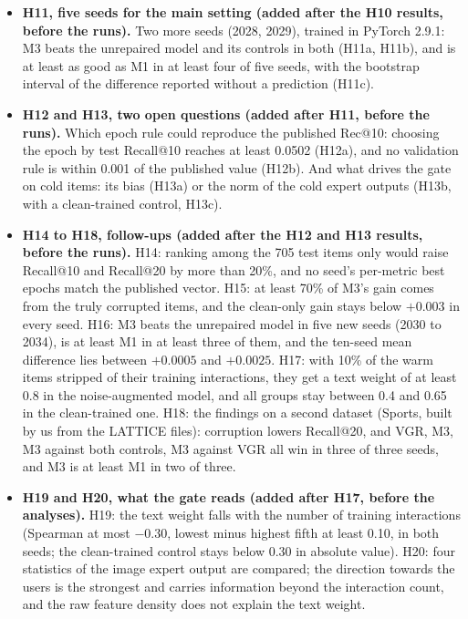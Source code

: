 \documentclass[conference]{IEEEtran}
\begin{document}
\begin{itemize}
\item \textbf{H11, five seeds for the main setting (added after the H10 results, before the runs).} Two more seeds (2028, 2029), trained in PyTorch 2.9.1: M3 beats the unrepaired model and its controls in both (H11a, H11b), and is at least as good as M1 in at least four of five seeds, with the bootstrap interval of the difference reported without a prediction (H11c).
\item \textbf{H12 and H13, two open questions (added after H11, before the runs).} Which epoch rule could reproduce the published Rec@10: choosing the epoch by test Recall@10 reaches at least 0.0502 (H12a), and no validation rule is within 0.001 of the published value (H12b). And what drives the gate on cold items: its bias (H13a) or the norm of the cold expert outputs (H13b, with a clean-trained control, H13c).
\item \textbf{H14 to H18, follow-ups (added after the H12 and H13 results, before the runs).} H14: ranking among the 705 test items only would raise Recall@10 and Recall@20 by more than 20\%, and no seed's per-metric best epochs match the published vector. H15: at least 70\% of M3's gain comes from the truly corrupted items, and the clean-only gain stays below $+0.003$ in every seed. H16: M3 beats the unrepaired model in five new seeds (2030 to 2034), is at least M1 in at least three of them, and the ten-seed mean difference lies between $+0.0005$ and $+0.0025$. H17: with 10\% of the warm items stripped of their training interactions, they get a text weight of at least 0.8 in the noise-augmented model, and all groups stay between 0.4 and 0.65 in the clean-trained one. H18: the findings on a second dataset (Sports, built by us from the LATTICE files): corruption lowers Recall@20, and VGR, M3, M3 against both controls, M3 against VGR all win in three of three seeds, and M3 is at least M1 in two of three.
\item \textbf{H19 and H20, what the gate reads (added after H17, before the analyses).} H19: the text weight falls with the number of training interactions (Spearman at most $-0.30$, lowest minus highest fifth at least 0.10, in both seeds; the clean-trained control stays below 0.30 in absolute value). H20: four statistics of the image expert output are compared; the direction towards the users is the strongest and carries information beyond the interaction count, and the raw feature density does not explain the text weight.
\end{itemize}

\end{document}
